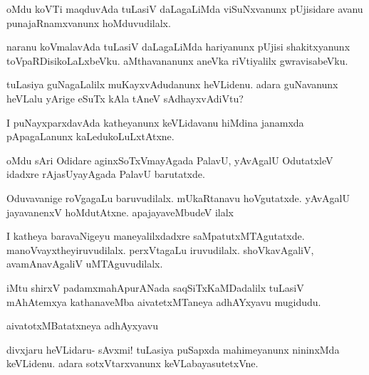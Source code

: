 \documentclass{article}
\begin{document}
\begin{mng}%
oMdu koVTi maqduvAda tuLasiV daLagaLiMda viSuNxvanunx pUjisidare avanu 
punajaRnamxvanunx hoMduvudilalx.
\end{mng}

\begin{mng}%
naranu koVmalavAda tuLasiV daLagaLiMda hariyanunx pUjisi shakitxyanunx 
toVpaRDisikoLaLxbeVku. aMthavananunx aneVka riVtiyalilx gwravisabeVku.
\end{mng}

\begin{mng}%
tuLasiya guNagaLalilx muKayxvAdudanunx heVLidenu. adara guNavanunx 
heVLalu yArige eSuTx kAla tAneV sAdhayxvAdiVtu?
\end{mng}

\begin{mng}%
I puNayxparxdavAda katheyanunx keVLidavanu hiMdina janamxda 
pApagaLanunx kaLedukoLuLxtAtxne.
\end{mng}

\begin{mng}%
oMdu sAri Odidare aginxSoTxVmayAgada PalavU, yAvAgalU OdutatxleV 
idadxre rAjasUyayAgada PalavU barutatxde.
\end{mng}

\begin{mng}%
Oduvavanige roVgagaLu baruvudilalx. mUkaRtanavu hoVgutatxde. yAvAgalU 
jayavanenxV hoMdutAtxne. apajayaveMbudeV ilalx
\end{mng}

\begin{mng}%
I katheya baravaNigeyu maneyalilxdadxre saMpatutxMTAgutatxde. 
manoVvayxtheyiruvudilalx. perxVtagaLu iruvudilalx. shoVkavAgaliV, 
avamAnavAgaliV uMTAguvudilalx.
\end{mng}

\begin{center}
iMtu shirxV padamxmahApurANada saqSiTxKaMDadalilx tuLasiV mAhAtemxya
kathanaveMba aivatetxMTaneya adhAYxyavu mugidudu.
\end{center}

\begin{center}
{\textbf\large{aivatotxMBatatxneya adhAyxyavu}}
\end{center}

\begin{mng}%
divxjaru heVLidaru- sAvxmi! tuLasiya puSapxda mahimeyanunx nininxMda 
keVLidenu. adara sotxVtarxvanunx keVLabayasutetxVne.
\end{mng}
\end{document}
